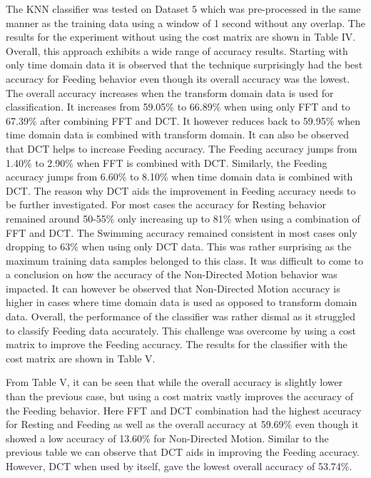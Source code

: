\documentclass[conference]{IEEEtran}
\begin{document}
The KNN classifier was tested on Dataset 5 which was pre-processed in the same manner as the training data using a window of 1 second without any overlap. The results for the experiment without using the cost matrix are shown in Table IV. Overall, this approach exhibits a wide range of accuracy results. Starting with only time domain data it is observed that the technique surprisingly had the best accuracy for Feeding behavior even though its overall accuracy was the lowest. The overall accuracy increases when the transform domain data is used for classification. It increases from 59.05\% to 66.89\% when using only FFT and to 67.39\% after combining FFT and DCT. It however reduces back to 59.95\% when time domain data is combined with transform domain. It can also be observed that DCT helps to increase Feeding accuracy. The Feeding accuracy jumps from 1.40\% to 2.90\% when FFT is combined with DCT. Similarly, the Feeding accuracy jumps from 6.60\% to 8.10\% when time domain data is combined with DCT. The reason why DCT aids the improvement in Feeding accuracy needs to be further investigated. For most cases the accuracy for Resting behavior remained around 50-55\% only increasing up to 81\% when using a combination of FFT and DCT. The Swimming accuracy remained consistent in most cases only dropping to 63\% when using only DCT data. This was rather surprising as the maximum training data samples belonged to this class. It was difficult to come to a conclusion on how the accuracy of the Non-Directed Motion behavior was impacted. It can however be observed that Non-Directed Motion accuracy is higher in cases where time domain data is used as opposed to transform domain data. Overall, the performance of the classifier was rather dismal as it struggled to classify Feeding data accurately. This challenge was overcome by using a cost matrix to improve the Feeding accuracy. The results for the classifier with the cost matrix are shown in Table V.

From Table V, it can be seen that while the overall accuracy is slightly lower than the previous case, but using a cost matrix vastly improves the accuracy of the Feeding behavior. Here FFT and DCT combination had the highest accuracy for Resting and Feeding as well as the overall accuracy at 59.69\% even though it showed a low accuracy of 13.60\% for Non-Directed Motion. Similar to the previous table we can observe that DCT aids in improving the Feeding accuracy. However, DCT when used by  itself,  gave the lowest overall accuracy of 53.74\%. 
\end{document}
